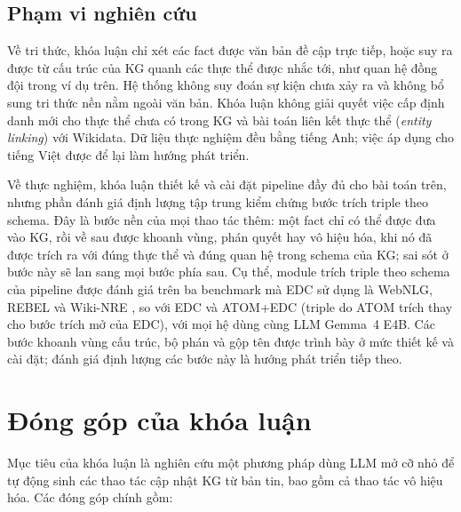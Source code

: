 \subsection{Phạm vi nghiên cứu}
\label{sec:intro-scope}

Về tri thức, khóa luận chỉ xét các fact được văn bản đề cập trực tiếp,
hoặc suy ra được từ cấu trúc của KG quanh các thực thể được nhắc tới, như quan hệ đồng đội trong ví dụ trên.
Hệ thống không suy đoán sự kiện chưa xảy ra và không bổ sung tri thức nền nằm ngoài văn bản.
Khóa luận không giải quyết việc cấp định danh mới cho thực thể chưa có trong KG
và bài toán liên kết thực thể (\textit{entity linking}) với Wikidata.
Dữ liệu thực nghiệm đều bằng tiếng Anh; việc áp dụng cho tiếng Việt được để lại làm hướng phát triển.

Về thực nghiệm, khóa luận thiết kế và cài đặt pipeline đầy đủ cho bài toán trên,
nhưng phần đánh giá định lượng tập trung kiểm chứng bước trích triple theo schema.
Đây là bước nền của mọi thao tác thêm: một fact chỉ có thể được đưa vào KG, rồi về sau được khoanh vùng, phán quyết hay vô hiệu hóa,
khi nó đã được trích ra với đúng thực thể và đúng quan hệ trong schema của KG; sai sót ở bước này sẽ lan sang mọi bước phía sau.
Cụ thể, module trích triple theo schema của pipeline được đánh giá trên ba benchmark mà EDC sử dụng
là WebNLG, REBEL và Wiki-NRE \cite{zhang2024edc,cabot2021rebel},
so với EDC và ATOM+EDC (triple do ATOM trích thay cho bước trích mở của EDC), với mọi hệ dùng cùng LLM Gemma~4 E4B.
Các bước khoanh vùng cấu trúc, bộ phán và gộp tên được trình bày ở mức thiết kế và cài đặt;
đánh giá định lượng các bước này là hướng phát triển tiếp theo.

\section{Đóng góp của khóa luận}
\label{sec:intro-contrib}

Mục tiêu của khóa luận là nghiên cứu một phương pháp dùng LLM mở cỡ nhỏ
để tự động sinh các thao tác cập nhật KG từ bản tin, bao gồm cả thao tác vô hiệu hóa.
Các đóng góp chính gồm:

